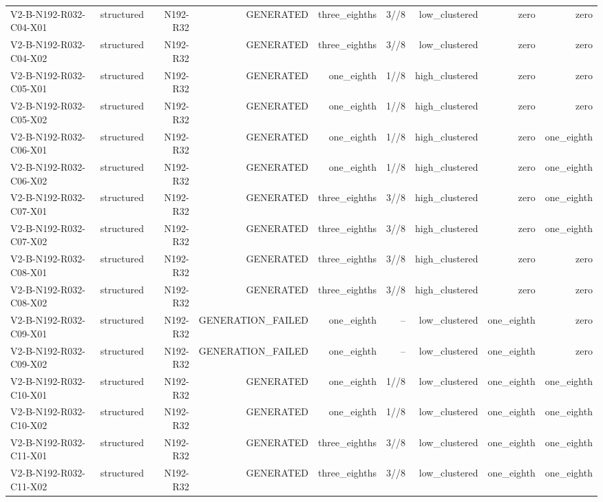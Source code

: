 {\begin{longtable}{lrrrrrrrr}
V2-B-N192-R032-C04-X01 & structured & N192-R32 & GENERATED & three\_eighths & 3//8 & low\_clustered & zero & zero \\
V2-B-N192-R032-C04-X02 & structured & N192-R32 & GENERATED & three\_eighths & 3//8 & low\_clustered & zero & zero \\
V2-B-N192-R032-C05-X01 & structured & N192-R32 & GENERATED & one\_eighth & 1//8 & high\_clustered & zero & zero \\
V2-B-N192-R032-C05-X02 & structured & N192-R32 & GENERATED & one\_eighth & 1//8 & high\_clustered & zero & zero \\
V2-B-N192-R032-C06-X01 & structured & N192-R32 & GENERATED & one\_eighth & 1//8 & high\_clustered & zero & one\_eighth \\
V2-B-N192-R032-C06-X02 & structured & N192-R32 & GENERATED & one\_eighth & 1//8 & high\_clustered & zero & one\_eighth \\
V2-B-N192-R032-C07-X01 & structured & N192-R32 & GENERATED & three\_eighths & 3//8 & high\_clustered & zero & one\_eighth \\
V2-B-N192-R032-C07-X02 & structured & N192-R32 & GENERATED & three\_eighths & 3//8 & high\_clustered & zero & one\_eighth \\
V2-B-N192-R032-C08-X01 & structured & N192-R32 & GENERATED & three\_eighths & 3//8 & high\_clustered & zero & zero \\
V2-B-N192-R032-C08-X02 & structured & N192-R32 & GENERATED & three\_eighths & 3//8 & high\_clustered & zero & zero \\
V2-B-N192-R032-C09-X01 & structured & N192-R32 & GENERATION\_FAILED & one\_eighth & -- & low\_clustered & one\_eighth & zero \\
V2-B-N192-R032-C09-X02 & structured & N192-R32 & GENERATION\_FAILED & one\_eighth & -- & low\_clustered & one\_eighth & zero \\
V2-B-N192-R032-C10-X01 & structured & N192-R32 & GENERATED & one\_eighth & 1//8 & low\_clustered & one\_eighth & one\_eighth \\
V2-B-N192-R032-C10-X02 & structured & N192-R32 & GENERATED & one\_eighth & 1//8 & low\_clustered & one\_eighth & one\_eighth \\
V2-B-N192-R032-C11-X01 & structured & N192-R32 & GENERATED & three\_eighths & 3//8 & low\_clustered & one\_eighth & one\_eighth \\
V2-B-N192-R032-C11-X02 & structured & N192-R32 & GENERATED & three\_eighths & 3//8 & low\_clustered & one\_eighth & one\_eighth \\

\end{longtable}}
